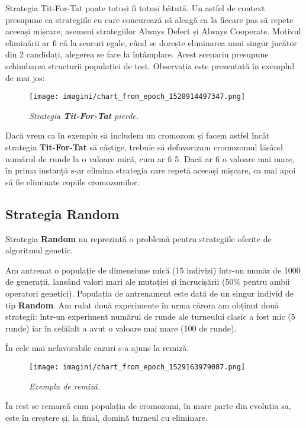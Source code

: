 Strategia Tit-For-Tat poate totuși fi totuși bătută. Un astfel de context presupune ca strategiile cu care concurează să aleagă ca la fiecare pas să repete aceeași mișcare, asemeni strategiilor Always Defect și Always Cooperate. Motivul eliminării ar fi că la scoruri egale, când se dorește eliminarea unui singur jucător din 2 candidați, alegerea se face la întâmplare. Acest scenariu presupune schimbarea structurii populației de test. Observația este prezentată în exemplul de mai jos: 

\begin{figure}[H]
	\centering
	\texttt{[image: imagini/chart\_from\_epoch\_1528914497347.png]}
	\caption{\textit{Strategia \textbf{Tit-For-Tat} pierde.}}
	\label{fig:tit_for_tat_pierde}
\end{figure}

Dacă vrem ca în exemplu să includem un cromozom și facem astfel încât strategia \textbf{Tit-For-Tat} să câștige, trebuie să defavorizam cromozomul lăsând numărul de runde la o valoare mică, cum ar fi 5. Dacă ar fi o valoare mai mare, în prima instanță s-ar elimina strategia care repetă aceeași mișcare, ca mai apoi să fie eliminate copiile cromozomilor. 

\subsection{Strategia \textbf{Random}}
 
Strategia \textbf{Random} nu reprezintă o problemă pentru strategiile oferite de algoritmul genetic.

Am antrenat o populație de dimensiune mică (15 indivizi) într-un număr de 1000 de generații, lansând valori mari ale mutației și încrucișării (50\% pentru ambii operatori genetici). Populația de antrenament este dată de un singur individ de tip \textbf{Random}. Am rulat două experimente în urma cărora am obținut două strategii: într-un experiment numărul de runde ale turneului clasic a fost mic (5 runde) iar în celălalt a avut o valoare mai mare (100 de runde).

În cele mai nefavorabile cazuri s-a ajuns la remiză.

\begin{figure}[H]
	\centering
	\texttt{[image: imagini/chart\_from\_epoch\_1529163979087.png]}
	\caption{\textit{Exemplu de remiză.}}
\end{figure}

În rest se remarcă cum populația de cromozomi, în mare parte din evoluția sa, este în creștere și, la final, domină turneul cu eliminare.  

